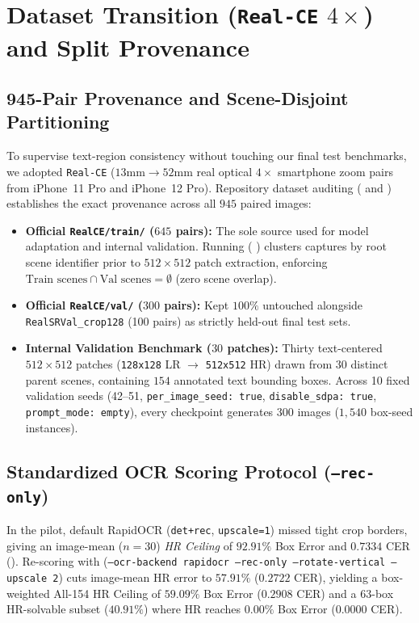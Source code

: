 \documentclass[11pt]{article}
\begin{document}
\section{Dataset Transition (\texttt{Real-CE} \texorpdfstring{$4\times$}{4x}) and Split Provenance}
\subsection{945-Pair Provenance and Scene-Disjoint Partitioning}
To supervise text-region consistency without touching our final test benchmarks, we adopted \texttt{Real-CE} ($13\text{mm} \to 52\text{mm}$ real optical $4\times$ smartphone zoom pairs from iPhone~11 Pro and iPhone~12 Pro). Repository dataset auditing ( and ) establishes the exact provenance across all $945$ paired images:
\begin{itemize}
    \item \textbf{Official \texttt{RealCE/train/} ($645$ pairs):} The sole source used for model adaptation and internal validation. Running  (   ) clusters captures by root scene identifier prior to $512\times 512$ patch extraction, enforcing $\text{Train scenes} \cap \text{Val scenes} = \emptyset$ (zero scene overlap).
    \item \textbf{Official \texttt{RealCE/val/} ($300$ pairs):} Kept $100\%$ untouched alongside \texttt{RealSRVal\_crop128} (100 pairs) as strictly held-out final test sets.
    \item \textbf{Internal Validation Benchmark ($30$ patches):} Thirty text-centered $512\times 512$ patches (\texttt{128x128} LR $\to$ \texttt{512x512} HR) drawn from $30$ distinct parent scenes, containing $154$ annotated text bounding boxes. Across 10 fixed validation seeds (42--51, \texttt{per\_image\_seed: true}, \texttt{disable\_sdpa: true}, \texttt{prompt\_mode: empty}), every checkpoint generates $300$ images ($1{,}540$ box-seed instances).
\end{itemize}

\subsection{Standardized OCR Scoring Protocol (\texttt{--rec-only})}
In the pilot, default RapidOCR (\texttt{det+rec}, \texttt{upscale=1}) missed tight crop borders, giving an image-mean ($n=30$) \emph{HR Ceiling} of $92.91\%$ Box Error and $0.7334$ CER (). Re-scoring with  (\texttt{--ocr-backend rapidocr --rec-only --rotate-vertical --upscale 2}) cuts image-mean HR error to $57.91\%$ ($0.2722$ CER), yielding a box-weighted All-154 HR Ceiling of $59.09\%$ Box Error ($0.2908$ CER) and a 63-box HR-solvable subset ($40.91\%$) where HR reaches $0.00\%$ Box Error ($0.0000$ CER).
\end{document}
